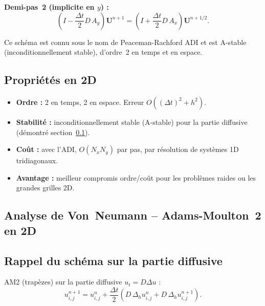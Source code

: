 \documentclass[11pt,a4paper]{report}
\begin{document}
\textbf{Demi-pas~2 (implicite en $y$) :}
\begin{equation}
  \left(I - \frac{\Delta t}{2}D\,A_y\right)\mathbf{U}^{n+1}
  = \left(I + \frac{\Delta t}{2}D\,A_x\right)\mathbf{U}^{n+1/2}.
\end{equation}

Ce sch\'ema est connu sous le nom de Peaceman-Rachford ADI et est A-stable (inconditionnellement
stable), d'ordre~2 en temps et en espace.

\subsection*{Propri\'et\'es en 2D}

\begin{itemize}[leftmargin=1.5em]
  \item \textbf{Ordre :} 2 en temps, 2 en espace. Erreur $O((\Delta t)^2+h^2)$.
  \item \textbf{Stabilit\'e :} inconditionnellement stable (A-stable) pour la partie
       diffusive (d\'emontr\'e section~\ref{sec:vonneumann_AM2_2D}).
  \item \textbf{Co\^ut :} avec l'ADI, $O(N_xN_y)$ par pas, par r\'esolution de
        syst\`emes 1D tridiagonaux.
  \item \textbf{Avantage :} meilleur compromis ordre/co\^ut pour les probl\`emes raides
        ou les grandes grilles 2D.
\end{itemize}






\subsection{Analyse de Von~Neumann -- Adams-Moulton~2 en 2D}
\label{sec:vonneumann_AM2_2D}

\subsection*{Rappel du sch\'ema sur la partie diffusive}

AM2 (trapèzes) sur la partie diffusive $u_t=D\Delta u$ :
\begin{equation}
  u_{i,j}^{n+1} = u_{i,j}^n
  + \frac{\Delta t}{2}\!\left(D\,\Delta_h u_{i,j}^n + D\,\Delta_h u_{i,j}^{n+1}\right).
\end{equation}
\end{document}
